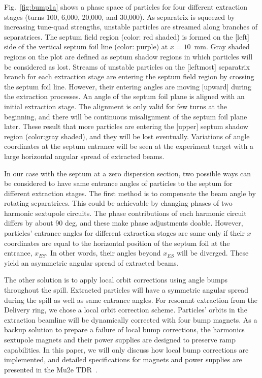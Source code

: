 \documentclass[aps,prstab,onecolumn,preprint]{revtex4-1}
\begin{document}
Fig.~\ref{fig:bump1a} shows a phase space of particles for four different extraction stages (turns 100, 6,000, 20,000, and 30,000). As separatrix is squeezed by increasing tune-quad strengths, unstable particles are streamed along branches of separatrices. The septum field region (color: red shaded) is formed on the [left] side of the vertical septum foil line (color: purple) at $x=10$~mm. Gray shaded regions on the plot are defined as septum shadow regions in which particles will be considered as lost. Streams of unstable particles on the [leftmost] separatrix branch for each extraction stage are entering the septum field region by crossing the septum foil line. However, their entering angles are moving [upward] during the extraction processes. An angle of the septum foil plane is aligned with an initial extraction stage. The alignment is only valid for few turns at the beginning, and there will be continuous misalignment of the septum foil plane later. These result that more particles are entering the [upper] septum shadow region (color:gray shaded), and they will be lost eventually.
Variations of angle coordinates at the septum entrance will be seen at the experiment target with a large horizontal angular spread of extracted beams.

In our case with the septum at a zero dispersion section, two possible ways can be considered to have same entrance angles of particles to the septum for different extraction stages. The first method is to compensate the beam angle by rotating separatrices. This could be achievable by changing phases of two harmonic sextupole circuits. The phase contributions of each harmonic circuit differs by about 90 deg, and these make phase adjustments doable. However, particles' entrance angles for different extraction stages are same only if their $x$ coordinates are equal to the horizontal position of the septum foil at the entrance, $x_{ES}$. In other words, their angles beyond $x_{ES}$ will be diverged. These yield an asymmetric angular spread of extracted beams.

The other solution is to apply local orbit corrections using angle bumps throughout the spill. Extracted particles will have a symmetric angular spread during the spill as well as same entrance angles. For resonant extraction from the Delivery ring, we chose a local orbit correction scheme. Particles' orbits in the extraction beamline will be dynamically corrected with four bump magnets. As a backup solution to prepare a failure of local bump corrections, the harmonics sextupole magnets and their power supplies are designed to preserve ramp capabilities. In this paper, we will only discuss how local bump corrections are implemented, and detailed specifications for magnets and power supplies are presented in the Mu2e TDR~\cite{tdr}.
\end{document}

